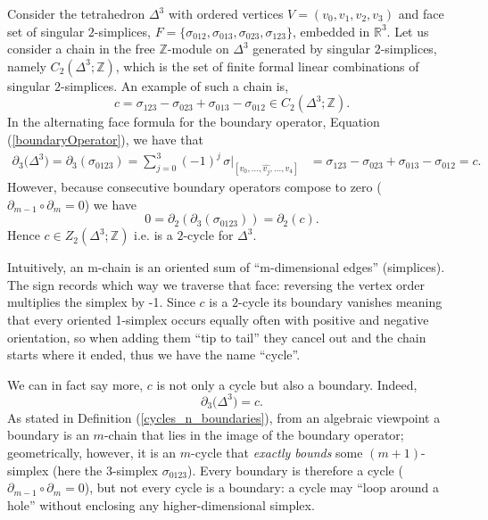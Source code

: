 \begin{example}
Consider the tetrahedron $\Delta^3$ with ordered vertices $V = (v_0,v_1,v_2,v_3)$ and face set of singular $2$-simplices, $F = \{ \sigma_{012}, \sigma_{013}, \sigma_{023}, \sigma_{123} \}$, embedded in $\mathbb{R}^3$. Let us consider a chain in the free $\mathbb{Z}$-module on $\Delta^3$ generated by singular $2$-simplices, namely $C_{2}(\Delta^3;\mathbb{Z})$, which is the set of finite formal linear combinations of singular $2$-simplices. An example of such a chain is,
$$c = \sigma_{123} - \sigma_{023} + \sigma_{013} - \sigma_{012} \in C_{2}(\Delta^3;\mathbb{Z}).$$
In the alternating face formula for the boundary operator, Equation (\ref{boundaryOperator}), we have that
\begin{align*}
\partial_3 \big(\Delta^3\big) = \partial_3 (\sigma_{0123}) = \sum_{j=0}^{3}(-1)^{j}\,\sigma\!\bigl|_{[v_0,\dots,\widehat{v_j},\dots,v_4]} &= \sigma_{123} - \sigma_{023} + \sigma_{013} - \sigma_{012} = c.
\end{align*}
However, because consecutive boundary operators compose to zero ($\partial_{m-1}\circ \partial_{m}=0$) we have $$0=\partial_2(\partial_3 (\sigma_{0123})) = \partial_2 (c).$$ Hence  $c \in Z_2(\Delta^3;\mathbb{Z})$ i.e. is a $2$-cycle for $\Delta^3$.

Intuitively, an m-chain is an oriented sum of “m-dimensional edges” (simplices). The sign records which way we traverse that face: reversing the vertex order multiplies the simplex by -1. Since $c$ is a $2$-cycle its boundary vanishes meaning that every oriented 1-simplex occurs equally
often with positive and negative orientation, so when adding them “tip to tail” they cancel out and the chain starts where it ended, thus we have the name “cycle”.

\noindent We can in fact say more, $c$ is not only a cycle but also a boundary. Indeed, $$\partial_3 \big(\Delta^3\big) = c.$$
As stated in Definition (\ref{cycles_n_boundaries}), from an algebraic viewpoint a boundary is an $m$-chain that lies in the image of the boundary operator; geometrically, however, it is an $m$-cycle that \emph{exactly bounds} some $(m+1)$-simplex (here the 3-simplex \(\sigma_{0123}\)).  Every boundary is therefore a cycle (\(\partial_{m-1}\!\circ\partial_{m}=0\)), but not every cycle is a
boundary: a cycle may “loop around a hole” without enclosing any higher-dimensional simplex.
\end{example}

